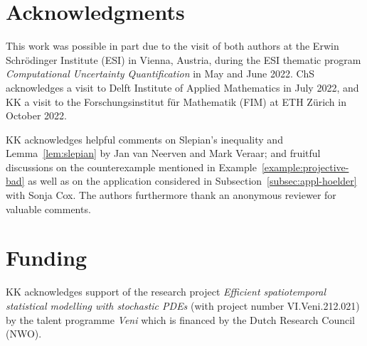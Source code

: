 \documentclass[reqno]{amsart}
\numberwithin{equation}{section}
\theoremstyle{remark}
\theoremstyle{definition}
\begin{document}
\section*{Acknowledgments} 


This work was possible in part due to the 
visit of both authors at the 
Erwin Schr\"odinger Institute (ESI) in Vienna,
Austria, during the ESI thematic program 
\emph{Computational Uncertainty Quantification} 
in May and June 2022. 
ChS acknowledges a visit to 
Delft Institute of Applied Mathematics in July 2022, 
and KK a visit to the 
Forschungsinstitut f\"ur Mathematik (FIM) 
at ETH Z\"urich in October 2022. 

KK acknowledges 
helpful comments on 
Slepian's inequality  
and Lemma~\ref{lem:slepian} 
by Jan van Neerven 
and Mark Veraar; 
and 
fruitful discussions 
on the counterexample 
mentioned in Example~\ref{example:projective-bad} 
as well as on the
application considered 
in Subsection~\ref{subsec:appl-hoelder} 
with Sonja Cox.  
The authors furthermore thank 
an anonymous reviewer for 
valuable comments. 


\section*{Funding} 

KK acknowledges support 
of the research project 
\emph{Efficient spatiotemporal statistical modelling 
	with stochastic PDEs} 
(with project number 
VI.Veni.212.021) 
by the talent programme \emph{Veni}  
which is financed by 
the Dutch Research Council (NWO). 



\end{document}
